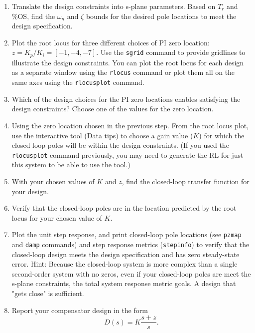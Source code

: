\documentclass[11pt]{article}
\begin{document}
\begin{enumerate}
\item Translate the design constraints into s-plane parameters.  Based on $T_r$ and \%OS, find the $\omega_n$ and $\zeta$ bounds for the desired pole locations to meet the design specification.
\item Plot the root locus for three different choices of PI zero location: $z = K_p/K_i = [-1, -4, -7]$.  Use the \texttt{sgrid} command to provide gridlines to illustrate the design constraints.  You can plot the root locus for each design as a separate window using the \texttt{rlocus} command or plot them all on the same axes using the \texttt{rlocusplot} command.
\item Which of the design choices for the PI zero locations enables satisfying the design constraints?   Choose one of the values for the zero location.
\item Using the zero location chosen in the previous step.   From the root locus plot, use the interactive tool (Data tips) to choose a gain value ($K$) for which the closed loop poles will be within the design constraints. (If you used the \texttt{rlocusplot} command previously, you may need to generate the RL for just this system to be able to use the tool.)  
\item With your chosen values of $K$ and $z$, find the closed-loop transfer function for your design.  
\item Verify that the closed-loop poles are in the location predicted by the root locus for your chosen value of $K$.
\item Plot the unit step response, and print closed-loop pole locations (see \texttt{pzmap} and \texttt{damp} commands) and step response metrics (\texttt{stepinfo}) to verify that the closed-loop design meets the design specification and has zero steady-state error.  Hint: Because the closed-loop system is more complex than a single second-order system with no zeros, even if your closed-loop poles are meet the s-plane constraints, the total system response metric goals.  A design that "gets close" is sufficient.
\item Report your compensator design in the form
  \[D(s) = K \frac{s+z}{s}.\]
\end{enumerate}
\end{document}
